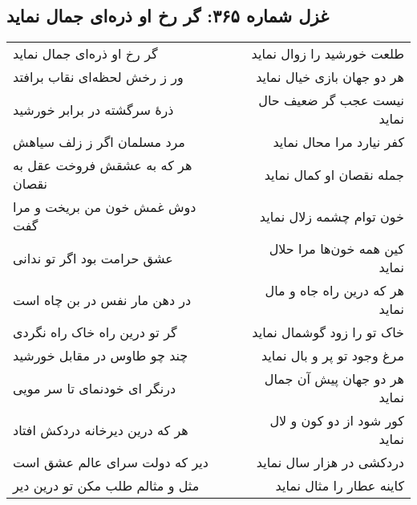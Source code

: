 \begin{center}
\section*{غزل شماره ۳۶۵: گر رخ او ذره‌ای جمال نماید}
\label{sec:365}
\begin{longtable}{l p{0.5cm} r}
گر رخ او ذره‌ای جمال نماید
&&
طلعت خورشید را زوال نماید
\\
ور ز رخش لحظه‌ای نقاب برافتد
&&
هر دو جهان بازی خیال نماید
\\
ذرهٔ سرگشته در برابر خورشید
&&
نیست عجب گر ضعیف حال نماید
\\
مرد مسلمان اگر ز زلف سیاهش
&&
کفر نیارد مرا محال نماید
\\
هر که به عشقش فروخت عقل به نقصان
&&
جمله نقصان او کمال نماید
\\
دوش غمش خون من بریخت و مرا گفت
&&
خون توام چشمه زلال نماید
\\
عشق حرامت بود اگر تو ندانی
&&
کین همه خون‌ها مرا حلال نماید
\\
در دهن مار نفس در بن چاه است
&&
هر که درین راه جاه و مال نماید
\\
گر تو درین راه خاک راه نگردی
&&
خاک تو را زود گوشمال نماید
\\
چند چو طاوس در مقابل خورشید
&&
مرغ وجود تو پر و بال نماید
\\
درنگر ای خودنمای تا سر مویی
&&
هر دو جهان پیش آن جمال نماید
\\
هر که درین دیرخانه دردکش افتاد
&&
کور شود از دو کون و لال نماید
\\
دیر که دولت سرای عالم عشق است
&&
دردکشی در هزار سال نماید
\\
مثل و مثالم طلب مکن تو درین دیر
&&
کاینه عطار را مثال نماید
\\
\end{longtable}
\end{center}

